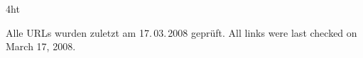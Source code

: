 \documentclass[
               fontsize=12pt, %
               paper=a4,
               twoside, %
               BCOR=3mm, %
               DIV=13,   %
               headinclude=true,
               footinclude=false,
               bibliography=totoc,
               headsepline,
               cleardoublepage=empty,
               parskip=half,
               final   %
               ]{scrbook}
\begin{document}





\iftex4ht
\else
\fi



\renewcommand*{\chapterpagestyle}{scrplain}
\pagestyle{scrheadings}

%
%
%



%
%
%


\printbibliography

\ifdeutsch
Alle URLs wurden zuletzt am 17.\,03.\,2008 geprüft.
\else
All links were last checked on March 17, 2008.
\fi

\end{document}
